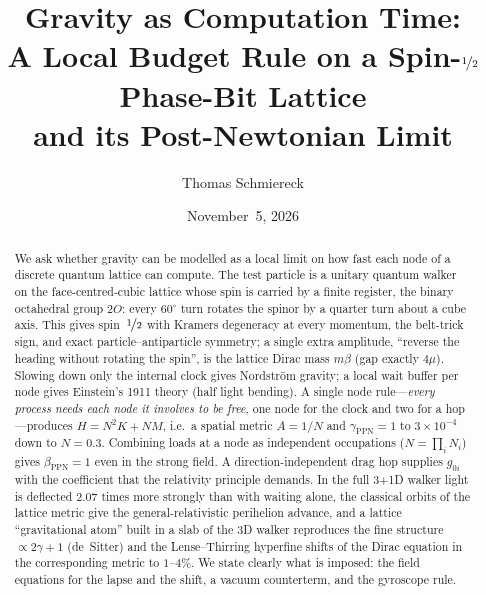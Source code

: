 \documentclass[twocolumn,showpacs,preprintnumbers,amsmath,amssymb]{revtex4-2}
\newcommand{\Ot}{2O}
\begin{document}

\title{Gravity as Computation Time:\\
A Local Budget Rule on a Spin-$\nicefrac12$ Phase-Bit Lattice\\
and its Post-Newtonian Limit}

\author{Thomas Schmiereck}

\date{November~5, 2026}

\begin{abstract}
We ask whether gravity can be modelled as a local limit on how fast each node
of a discrete quantum lattice can compute.
The test particle is a unitary quantum walker on the face-centred-cubic
lattice whose spin is carried by a finite register, the binary octahedral
group $\Ot$: every $60^\circ$ turn rotates the spinor by a quarter turn about
a cube axis.
This gives spin~$\nicefrac12$ with Kramers degeneracy at every momentum, the
belt-trick sign, and exact particle--antiparticle symmetry; a single extra
amplitude, ``reverse the heading without rotating the spin'', is the lattice
Dirac mass $m\beta$ (gap exactly $4\mu$).
Slowing down only the internal clock gives Nordstr\"om gravity; a local wait
buffer per node gives Einstein's 1911 theory (half light bending).
A single node rule---\emph{every process needs each node it involves to be
free}, one node for the clock and two for a hop---produces
$H=N^{2}K+NM$, i.e.\ a spatial metric $A=1/N$ and $\gamma_{\mathrm{PPN}}=1$
to $3\times10^{-4}$ down to $N=0.3$.
Combining loads at a node as independent occupations ($N=\prod_i N_i$) gives
$\beta_{\mathrm{PPN}}=1$ even in the strong field.
A direction-independent drag hop supplies $g_{0i}$ with the coefficient that
the relativity principle demands.
In the full \mbox{3\!+\!1D} walker light is deflected $2.07$ times more strongly
than with waiting alone, the classical orbits of the lattice metric give the
general-relativistic perihelion advance, and a lattice ``gravitational atom''
built in a slab of the 3D walker reproduces the fine structure
$\propto 2\gamma+1$ (de~Sitter) and the Lense--Thirring hyperfine shifts of the
Dirac equation in the corresponding metric to $1$--$4\%$.
We state clearly what is imposed: the field equations for the lapse and the
shift, a vacuum counterterm, and the gyroscope rule.
\end{abstract}
\end{document}
